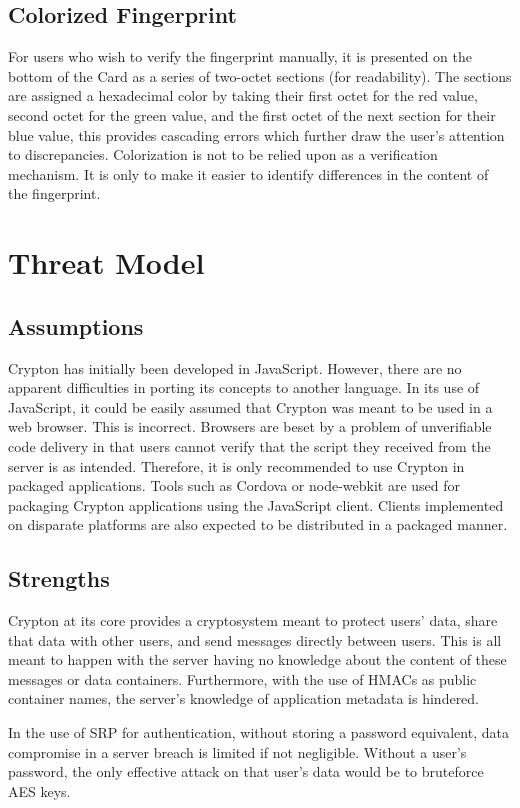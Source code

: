 \documentclass[conference]{IEEEtran}
\begin{document}
\subsection{Colorized Fingerprint}
For users who wish to verify the fingerprint manually, it is presented on the
bottom of the Card as a series of two-octet sections (for readability). The
sections are assigned a hexadecimal color by taking their first octet for the
red value, second octet for the green value, and the first octet of the next section
for their blue value, this provides cascading errors which further draw the user's
attention to discrepancies. Colorization is not to be relied upon as a verification
mechanism. It is only to make it easier to identify differences in the content of the fingerprint.

\section{Threat Model}
\subsection{Assumptions}
Crypton has initially been developed in JavaScript. However, there are no
apparent difficulties in porting its concepts to another language.
In its use of JavaScript, it could be easily assumed that Crypton was meant to
be used in a web browser. This is incorrect. Browsers are beset by a problem of
unverifiable code delivery in that users cannot verify that the script they received
from the server is as intended. Therefore, it is only recommended to use
Crypton in packaged applications. Tools such as Cordova\cite{cordova} or
node-webkit\cite{nodewebkit} are
used for packaging Crypton applications using the JavaScript client.
Clients implemented on disparate platforms are also expected to be distributed
in a packaged manner.

\subsection{Strengths}
Crypton at its core provides a cryptosystem meant to protect users' data,
share that data with other users, and send messages directly between users.
This is all meant to happen with the server having no knowledge about the content
of these messages or data containers. Furthermore, with the use of HMACs as public 
container names, the server's knowledge of application metadata is hindered.

In the use of SRP for authentication, without storing a password equivalent,
data compromise in a server breach is limited if not negligible. Without a user's
password, the only effective attack on that user's data would be to bruteforce
AES keys.
\end{document}
